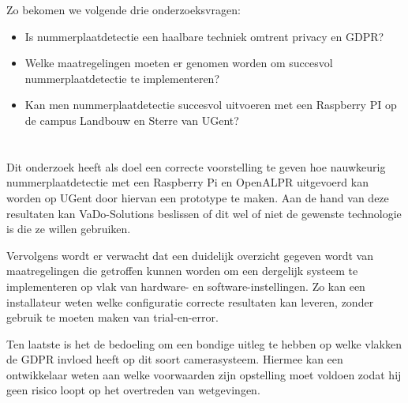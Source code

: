 Zo bekomen we volgende drie onderzoeksvragen:
\begin{itemize}
	\item Is nummerplaatdetectie een haalbare techniek omtrent privacy en GDPR?
	\item Welke maatregelingen moeten er genomen worden om succesvol nummerplaatdetectie te implementeren?
	\item Kan men nummerplaatdetectie succesvol uitvoeren met een Raspberry PI op de campus Landbouw en Sterre van UGent?
\end{itemize}

\section{}
\label{sec:onderzoeksdoelstelling}


Dit onderzoek heeft als doel een correcte voorstelling te geven hoe nauwkeurig nummerplaatdetectie met een Raspberry Pi en OpenALPR uitgevoerd kan worden op UGent door hiervan een prototype te maken. Aan de hand van deze resultaten kan VaDo-Solutions beslissen of dit wel of niet de gewenste technologie is die ze willen gebruiken.

Vervolgens wordt er verwacht dat een duidelijk overzicht gegeven wordt van maatregelingen die getroffen kunnen worden om een dergelijk systeem te implementeren op vlak van hardware- en software-instellingen. Zo kan een installateur weten welke configuratie correcte resultaten kan leveren, zonder gebruik te moeten maken van trial-en-error.

Ten laatste is het de bedoeling om een bondige uitleg te hebben op welke vlakken de GDPR invloed heeft op dit soort camerasysteem. Hiermee kan een ontwikkelaar weten aan welke voorwaarden zijn opstelling moet voldoen zodat hij geen risico loopt op het overtreden van wetgevingen.

\section{}
\label{sec:opzet-bachelorproef}


